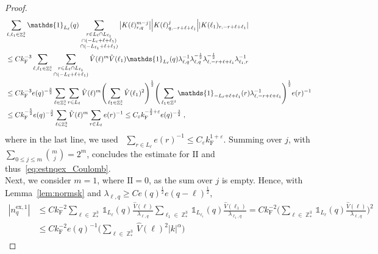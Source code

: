 \documentclass[12pt,a4paper]{article}
\numberwithin{equation}{section}
\newcommand{\1}{\mathbb{I}}
\newcommand{\ex}{\mathrm{ex}}
\newcommand{\F}{\mathrm{F}}
\newcommand{\II}{\mathrm{II}}
\DeclareMathOperator{\Z}{\mathbb{Z}}
\newcommand{\half}{\frac{1}{2}}
\theoremstyle{plain}
\theoremstyle{definition}
\theoremstyle{remark}
\theoremstyle{plain}
\theoremstyle{definition}
\theoremstyle{remark}
\begin{document}
\begin{proof}
\begin{equation}
\begin{aligned}
	&\sum_{\ell,\ell_1 \in \Z^3_*}
		\mathds{1}_{L_\ell}(q)
		\sum_{\substack{r\in L_{\ell} \cap L_{\ell_1}\\ \cap (-L_{\ell}+\ell+\ell_1) \\ \cap (-L_{\ell_1}+\ell+\ell_1 )}}
		\abs{K(\ell)^{m-j}_{r,q}}
		\abs{K(\ell)^j_{q,-r+\ell+\ell_1}}
		\abs{K(\ell_1)_{r,-r+\ell+\ell_1}} \\
	&\leq C k_{\F}^{-3} \sum_{\ell,\ell_1 \in \Z^3_*} \sum_{\substack{r \in L_\ell \cap L_{\ell_1} \\ \cap (-L_{\ell}+\ell+\ell_1)}}
		\hat{V}(\ell)^m \hat{V}(\ell_1)
		\mathds{1}_{L_\ell}(q)
		\lambda_{\ell,q}^{-1} \lambda_{\ell,q}^{-\half} \lambda_{\ell,-r+\ell+\ell_1}^{-\half} \lambda_{\ell_1,r}^{-1} \\
	&\leq C k_{\F}^{-3} e(q)^{-\frac 32} \sum_{\ell \in \Z^3_*} \sum_{r \in L_\ell}
		\hat{V}(\ell)^m
		\Bigg( \sum_{\ell_1 \in \Z^3_*} \hat{V}(\ell_1)^2  \Bigg)^{\half}
		\Bigg( \sum_{\ell_1 \in \Z^3} \mathds{1}_{-L_{\ell}+\ell+\ell_1}(r) \lambda_{\ell,-r+\ell+\ell_1}^{-1} \Bigg)^{\half}
		 e(r)^{-1} \\
	&\leq C k_{\F}^{-\frac 52} e(q)^{-\frac 32} \sum_{\ell \in \Z^3_*} \hat{V}(\ell)^m
	\sum_{r \in L_\ell} e(r)^{-1}
	\leq C_\varepsilon k_{\F}^{-\frac 32 + \varepsilon} e(q)^{-\frac 32} \;,
\end{aligned}
\end{equation}
where in the last line, we used~\cite[Lemma~3.2]{CHN24} $ \sum_{r \in L_\ell} e(r)^{-1} \le C_\varepsilon k_{\F}^{1+\varepsilon} $. Summing over $ j $, with $ \sum_{0 \le j \le m} {{m}\choose j} = 2^m $, concludes the estimate for $ \II $ and thus~\eqref{eq:estnqex_Coulomb}.\\
Next, we consider $ m = 1 $, where $ \II = 0 $, as the sum over $ j $ is empty. Hence, with Lemma~\ref{lem:normsk} and $ \lambda_{\ell,q} \ge C e(q)^{\half} e(q-\ell)^{\half} $,
\begin{equation}
\begin{aligned}
	|n_q^{\ex,1}|
	&\leq C k_{\F}^{-2}
		\sum_{\ell \in \Z^3_*} \mathds{1}_{L_\ell}(q) \frac{\hat{V}(\ell)}{\lambda_{\ell,q}}
		\sum_{\ell_1 \in \Z^3_*} \mathds{1}_{L_{\ell_1}}(q) \frac{\hat{V}(\ell_1)}{\lambda_{\ell_1,q}}
	= C k_{\F}^{-2}
		\Bigg( \sum_{\ell \in \Z^3_*} \mathds{1}_{L_\ell}(q) \frac{\hat{V}(\ell)}{\lambda_{\ell,q}} \Bigg)^2 \\
	&\leq C k_{\F}^{-2} e(q)^{-1}
		\Bigg( \sum_{\ell \in \Z^3_*} \hat{V}(\ell)^2 |k|^{\alpha} \Bigg)

\end{aligned}
\end{equation}
\end{proof}
\end{document}
